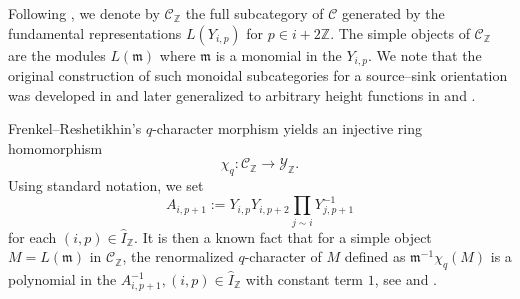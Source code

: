 \documentclass[12pt]{amsart}
\theoremstyle{plain}
\theoremstyle{definition}
\numberwithin{equation}{section}
\newcommand{\IZ}{\widehat{I}_{\mathbb{Z}}}
\newcommand{\YZ}{\mathcal{Y}_{\mathbb{Z}}}
\newcommand{\CZ}{\mathcal{C}_{\mathbb{Z}}}
\begin{document}
 
Following \cite{HL15}, we denote by $\CZ$ the full subcategory of $\mathcal{C}$ generated by the fundamental representations $L(Y_{i,p})$ for $p \in i + 2 \mathbb{Z}$. The simple objects of $\CZ$ are the modules $L(\mathfrak{m})$ where $\mathfrak{m}$ is a monomial in the $Y_{i,p}$. We note that the original construction of such monoidal subcategories for a source--sink orientation was developed in \cite{HL10} and later generalized to arbitrary height functions in \cite{HL15} and \cite{kashiwara2020monoidal, KKOP24}.


Frenkel--Reshetikhin's $q$-character morphism \cite[Theorem 3]{FR99} yields an injective ring homomorphism 
 $$ \chi_q : \CZ \longrightarrow \YZ . $$
 Using standard notation, we set 
 $$ A_{i,p+1} := Y_{i,p}Y_{i,p+2} \prod_{j \sim i} Y_{j,p+1}^{-1} $$
 for each $(i,p) \in \IZ$. It is then a known fact that for a simple object $ M = L(\mathfrak{m})$ in $\CZ$, the renormalized $q$-character of $M$ defined as $\mathfrak{m}^{-1} \chi_q(M)$ is a polynomial in the $A_{i,p+1}^{-1} , (i,p) \in \IZ$ with constant term $1$, see \cite[Conjecture 1]{FR99} and \cite[Theorem 4.1]{FM01}.
\end{document}
